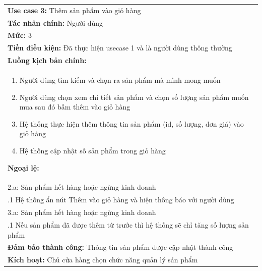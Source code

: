 \begin{center}
	\begin{tabularx}{\linewidth}{|X|}
		\cline{1-2}
		\textbf{Use case 3:} Thêm sản phẩm vào giỏ hàng                                                \\
		\textbf{Tác nhân chính:} Người dùng                                                            \\
		\textbf{Mức:} 3                                                                                \\
		\textbf{Tiền điều kiện:} Đã thực hiện usecase 1 và là người dùng thông thường                  \\
		\textbf{Luồng kịch bản chính:}                                                                 \\
		\begin{enumerate}
			\vspace{-2em}
			\itemsep-0.5em
			\item Người dùng tìm kiếm và chọn ra sản phẩm mà mình mong muốn
			\item Người dùng chọn xem chi tiết sản phẩm và chọn số lượng sản phẩm muốn mua sau đó bấm thêm vào giỏ hàng
			\item Hệ thống thực hiện thêm thông tin sản phẩm  (id, số lượng, đơn giá) vào giỏ hàng
			\item Hệ thống cập nhật số sản phẩm trong giỏ hàng
			      \vspace{-1em}
		\end{enumerate}
		\textbf{Ngoại lệ:}                                                                             \\
		\hspace{1em}2.a: Sản phẩm hết hàng hoặc ngừng kinh doanh                                       \\
		\hspace{2.5em}.1 Hệ thống ẩn nút Thêm vào giỏ hàng và hiện thông báo với người dùng            \\
		\hspace{1em}3.a: Sản phẩm hết hàng hoặc ngừng kinh doanh                                       \\
		\hspace{2.5em}.1 Nếu sản phẩm đã được thêm từ trước thì hệ thống sẽ chỉ tăng số lượng sản phẩm \\
		\textbf{Đảm bảo thành công:} Thông tin sản phẩm được cập nhật thành công                       \\
		\textbf{Kích hoạt:} Chủ cửa hàng chọn chức năng quản lý sản phẩm
		\cline{1-2}
	\end{tabularx}
\end{center}

